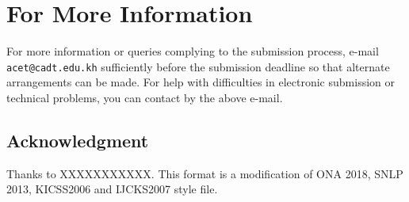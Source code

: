 \documentclass[11pt,a4paper]{article}
\begin{document}
\section{For More Information}

For more information or queries complying to the submission process,
e-mail {\tt acet@cadt.edu.kh} sufficiently before the submission
deadline so that alternate arrangements can be made.  For help with
difficulties in electronic submission or technical problems, you can
contact by the above e-mail.

\subsection*{Acknowledgment}

Thanks to XXXXXXXXXXX.  This format is a modification of ONA 2018, SNLP 2013, KICSS2006 
and IJCKS2007 style file.




\end{document}
